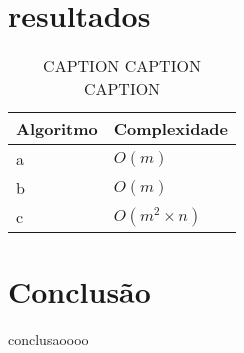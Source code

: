 \documentclass[mirror, portugues]{revdetua}
\begin{document}
\section{resultados}

\begin{table}[H]
\centering
\caption{CAPTION CAPTION CAPTION}
\label{table:numops}
\begin{tabular}{ll}
\toprule
\textbf{Algoritmo} & \textbf{Complexidade} \\
\midrule
a & $O(m)$ \\
b & $O(m)$ \\
c & $O(m^2 \times n)$ \\
\bottomrule
\end{tabular}
\end{table}




\section{Conclusão}

conclusaoooo


\end{document}
